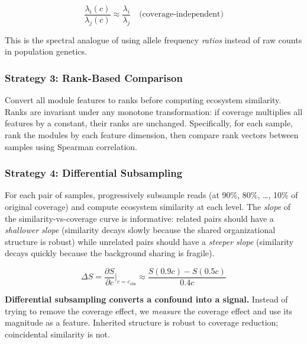 \documentclass{../yalumba}
\begin{document}
\begin{equation}
  \frac{\lambda_i(c)}{\lambda_j(c)} \approx
  \frac{\lambda_i}{\lambda_j} \quad \text{(coverage-independent)}
  \label{eq:ratio}
\end{equation}

This is the spectral analogue of using allele frequency \emph{ratios}
instead of raw counts in population genetics.

\subsubsection{Strategy 3: Rank-Based Comparison}

Convert all module features to ranks before computing ecosystem
similarity.  Ranks are invariant under any monotone transformation:
if coverage multiplies all features by a constant, their ranks are
unchanged.  Specifically, for each sample, rank the modules by each
feature dimension, then compare rank vectors between samples using
Spearman correlation.

\subsubsection{Strategy 4: Differential Subsampling}

For each pair of samples, progressively subsample reads (at 90\%, 80\%,
\ldots, 10\% of original coverage) and compute ecosystem similarity at
each level.  The \emph{slope} of the similarity-vs-coverage curve is
informative: related pairs should have a \emph{shallower slope}
(similarity decays slowly because the shared organizational structure
is robust) while unrelated pairs should have a \emph{steeper slope}
(similarity decays quickly because the background sharing is fragile).

\begin{equation}
  \Delta S = \frac{\partial S}{\partial c} \bigg|_{c = c_{\mathrm{obs}}}
  \approx \frac{S(0.9c) - S(0.5c)}{0.4c}
  \label{eq:slope}
\end{equation}

\begin{keyfinding}
\textbf{Differential subsampling converts a confound into a signal.}
Instead of trying to remove the coverage effect, we \emph{measure} the
coverage effect and use its magnitude as a feature.  Inherited structure
is robust to coverage reduction; coincidental similarity is not.
\end{keyfinding}


\end{document}

